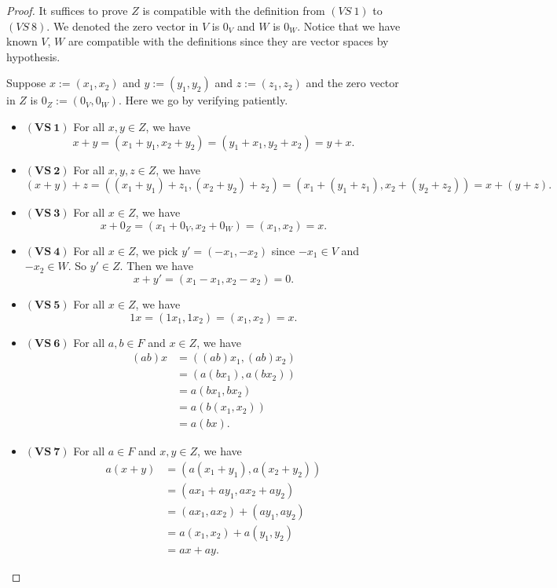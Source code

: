 \begin{Exercise}
	\begin{proof}
		It suffices to prove $Z$ is compatible with the definition from $(VS\ 1)$ to $(VS\ 8)$. We denoted the zero vector in  $V$ is $0_V$ and $W$ is $0_W$. Notice that we have known $V$, $W$ are compatible with the definitions since they are vector spaces by hypothesis.
		
		Suppose $x := (x_1,x_2)$ and $y := (y_1,y_2)$ and $z := (z_1,z_2)$ and the zero vector in $Z$ is $0_Z := (0_V,0_W)$. Here we go by verifying patiently.
		\begin{itemize}
			\item $\mathbf{(VS\ 1)}$
			For all $x,y \in Z$, we have
			$$
			x+y
			= (x_1+y_1,x_2+y_2)
			= (y_1+x_1,y_2+x_2)
			= y+x.
			$$
			
			\item $\mathbf{(VS\ 2)}$
			For all $x,y,z\in Z$, we have
			$$
			(x+y)+z
			= ( (x_1+y_1)+z_1, (x_2+y_2)+z_2 )
			= ( x_1+(y_1+z_1), x_2+(y_2+z_2) )
			= x+(y+z).
			$$
			
			\item $\mathbf{(VS\ 3)}$
			For all $x\in Z$, we have
			$$
			x+0_Z
			= (x_1 + 0_V, x_2+0_W)
			= (x_1,x_2)
			= x.
			$$
			
			\item $\mathbf{(VS\ 4)}$
			For all $x\in Z$, we pick $y' = (-x_1, -x_2)$ since $-x_1\in V$ and $-x_2\in W$. So $y'\in Z$. Then we have
			$$
			x+y'
			= (x_1-x_1, x_2-x_2)
			= 0.
			$$
			
			\item $\mathbf{(VS\ 5)}$
			For all $x\in Z$, we have
			$$
			1x
			= (1 x_1,1 x_2)
			= (x_1, x_2)
			= x.
			$$
			
			\item $\mathbf{(VS\ 6)}$
			For all $a,b\in F$ and $x\in Z$, we have
			\begin{align*}
				(ab)x
				&= ( (ab) x_1, (ab) x_2) \\
				&= (a (b x_1), a (b x_2)) \\
				&= a (b x_1, b x_2) \\
				&= a (b (x_1, x_2) ) \\
				&= a(bx).
			\end{align*}
			
			\item $\mathbf{(VS\ 7)}$
			For all $a\in F$ and $x,y\in Z$, we have
			\begin{align*}
				a(x+y)
				&= (a(x_1+y_1), a(x_2+y_2)) \\
				&= (a x_1 + a y_1, a x_2 + a y_2) \\
				&= (a x_1, a x_2) + (a y_1, a y_2) \\
				&= a(x_1, x_2) + a(y_1,y_2) \\
				&= a x+a y.
			\end{align*}
			

\end{itemize}
\end{proof}
\end{Exercise}
